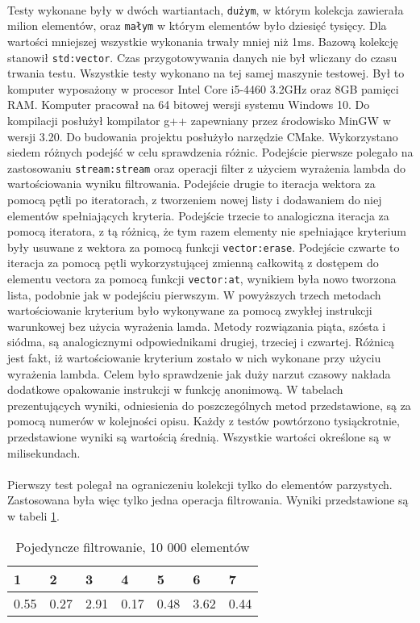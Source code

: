 \documentclass[a4paper,10pt]{report}
\begin{document}
\paragraph{}
Testy wykonane były w dwóch wartiantach, \verb|dużym|, w którym kolekcja zawierała milion elementów, oraz \verb|małym| w którym elementów było dziesięć tysięcy. Dla wartości mniejszej wszystkie wykonania trwały mniej niż 1ms. Bazową kolekcję stanowił \verb|std:vector|. Czas przygotowywania danych nie był wliczany do czasu trwania testu. Wszystkie testy wykonano na tej samej maszynie testowej. Był to komputer wyposażony w procesor Intel Core i5-4460 3.2GHz oraz 8GB pamięci RAM. Komputer pracował na 64 bitowej wersji systemu Windows 10. Do kompilacji posłużył kompilator g++ zapewniany przez środowisko MinGW w wersji 3.20. Do budowania projektu posłużyło narzędzie CMake. 
Wykorzystano siedem różnych podejść w celu sprawdzenia różnic. Podejście pierwsze polegało na zastosowaniu \verb|stream:stream| oraz operacji filter z użyciem wyrażenia lambda do wartościowania wyniku filtrowania.
Podejście drugie to iteracja wektora za pomocą pętli po iteratorach, z tworzeniem nowej listy i dodawaniem do niej elementów spełniających kryteria.
Podejście trzecie to analogiczna iteracja za pomocą iteratora, z tą różnicą, że tym razem elementy nie spełniające kryterium były usuwane z wektora za pomocą funkcji \verb|vector:erase|.
Podejście czwarte to iteracja za pomocą pętli wykorzystującej zmienną całkowitą z dostępem do elementu vectora za pomocą funkcji \verb|vector:at|, wynikiem była nowo tworzona lista, podobnie jak w podejściu pierwszym.
W powyższych trzech metodach wartościowanie kryterium było wykonywane za pomocą zwykłej instrukcji warunkowej bez użycia wyrażenia lamda.
Metody rozwiązania piąta, szósta i siódma, są analogicznymi odpowiednikami drugiej, trzeciej i czwartej. Różnicą jest fakt, iż wartościowanie kryterium zostało w nich wykonane przy użyciu wyrażenia lambda. Celem było sprawdzenie jak duży narzut czasowy nakłada dodatkowe opakowanie instrukcji w funkcję anonimową.
W tabelach prezentujących wyniki, odniesienia do poszczególnych metod przedstawione, są za pomocą numerów w kolejności opisu.
Każdy z testów powtórzono tysiąckrotnie, przedstawione wyniki są wartością średnią. Wszystkie wartości określone są w milisekundach.
\paragraph{}
Pierwszy test polegał na ograniczeniu kolekcji tylko do elementów parzystych. Zastosowana była więc tylko jedna operacja filtrowania. Wyniki przedstawione są w tabeli \ref{tab1}.
\begin{table}[t]
	\caption{Pojedyncze filtrowanie, 10 000 elementów}
	\label{tab1}
\begin{tabular}{|l|l|l|l|l|l|l|}
	\hline 
	1 & 2 & 3 & 4 & 5 & 6 & 7\\
	\hline
	0.55 & 0.27 & 2.91 & 0.17 & 0.48 & 3.62 & 0.44\\
	\hline
\end{tabular} 
\end{table}
\end{document}
